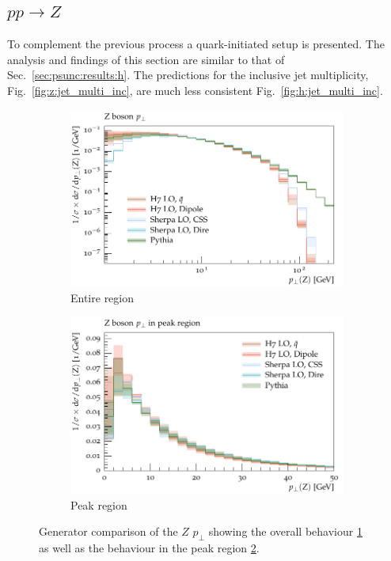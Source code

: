 \subsection{$pp\to Z$}
\label{sec:psunc:results:z}
To complement the previous process a quark-initiated setup is presented. The analysis and findings of this section are similar to that of Sec.~\ref{sec:psunc:results:h}. The predictions for the inclusive jet multiplicity, Fig.~\ref{fig:z:jet_multi_inc}, are much less consistent Fig.~\ref{fig:h:jet_multi_inc}.
\begin{figure}[h]
  \centering
    \begin{subfigure}[t]{0.49\textwidth}
    \includegraphics[width=\textwidth]{plots/Z-91-MuShower/LH_Z/X_pT.pdf}
    \caption{Entire region}
    \label{fig:z:pt_full}
  \end{subfigure}
%
  \begin{subfigure}[t]{0.49\textwidth}
    \includegraphics[width=\textwidth]{plots/Z-91-MuShower/LH_Z/X_pT_peak.pdf}
    \caption{Peak region}
    \label{fig:z:pt_peak}
  \end{subfigure}
  \caption{Generator comparison of the $Z$ $p_\perp$ showing the overall behaviour \ref{fig:z:pt_full} as well as the behaviour in the peak region \ref{fig:z:pt_peak}.}
  \label{fig:z:pt}
\end{figure}

